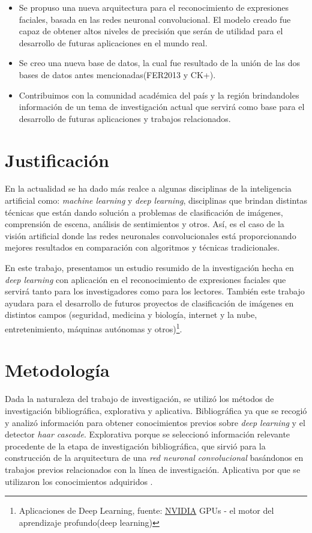 \begin{itemize}
\item Se propuso una nueva arquitectura para el reconocimiento de expresiones faciales, basada en las redes neuronal convolucional. El modelo creado fue capaz de obtener altos niveles de precisión que serán de utilidad para el desarrollo de futuras aplicaciones en el mundo real.
\item Se creo una nueva base de datos, la cual fue resultado de la unión de las dos bases de datos antes mencionadas(FER2013 y CK+).
\item Contribuimos con la comunidad académica del país y la región brindandoles información de un tema de investigación actual que servirá como base para el desarrollo de futuras aplicaciones y trabajos relacionados.
\end{itemize}
 

\section{Justificación}
En la actualidad se ha dado más realce a algunas disciplinas de la inteligencia artificial como: \textit{machine learning} y \textit{deep learning}, disciplinas que brindan distintas técnicas que están dando solución a problemas de clasificación de imágenes, comprensión de escena, análisis de sentimientos y otros. Así, es el caso de la visión artificial donde las redes neuronales convolucionales está proporcionando mejores resultados en comparación con algoritmos y técnicas tradicionales.

En este trabajo, presentamos un estudio resumido de la investigación hecha en \textit{deep learning} con aplicación en el reconocimiento de expresiones faciales que servirá tanto para los investigadores como para los lectores. También este trabajo ayudara para el desarrollo de futuros proyectos de clasificación de imágenes en distintos campos (seguridad, medicina y biología, internet y la nube, entretenimiento, máquinas autónomas y otros)\footnote[4]{Aplicaciones de Deep Learning, fuente: \href{https://developer.nvidia.com/deep-learning}{NVIDIA} GPUs - el motor del aprendizaje profundo(deep learning)}.


\section{Metodología}
Dada la naturaleza del trabajo de investigación, se utilizó los métodos de investigación bibliográfica, explorativa y aplicativa. Bibliográfica ya que se recogió y analizó información para obtener conocimientos previos sobre \textit{deep learning} y el detector \textit{haar cascade}. Explorativa porque se seleccionó información relevante procedente de la etapa de investigación bibliográfica, que sirvió para la construcción de la arquitectura de una \textit{red neuronal convolucional} basándonos en trabajos previos relacionados con la línea de investigación. Aplicativa por que se utilizaron los conocimientos adquiridos \cite{19sabino1994hacer}\cite{23silva2001metodologia}.


